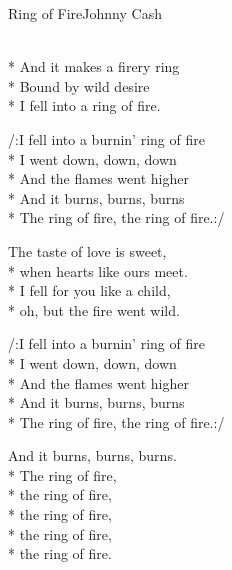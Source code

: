 \documentclass[10.5pt]{book}
\begin{document}
\begin{poem}{Ring of Fire}{Johnny Cash}

\settowidth{\versewidth}{I fell into a burnin' ring of fire}

\\*
And it makes a firery ring\\*
Bound by wild desire\\*
I fell into a ring of fire.

/:I fell into a burnin' ring of fire\\*
I went down, down, down\\*
And the flames went higher\\*
And it burns, burns, burns\\*
The ring of fire, the ring of fire.:/

The taste of love is sweet,\\*
when hearts like ours meet.\\*
I fell for you like a child,\\*
oh, but the fire went wild.

/:I fell into a burnin' ring of fire\\*
I went down, down, down\\*
And the flames went higher\\*
And it burns, burns, burns\\*
The ring of fire, the ring of fire.:/

And it burns, burns, burns.\\*
The ring of fire,\\*
the ring of fire,\\*
the ring of fire,\\*
the ring of fire,\\*
the ring of fire.

\end{poem}
\end{document}
